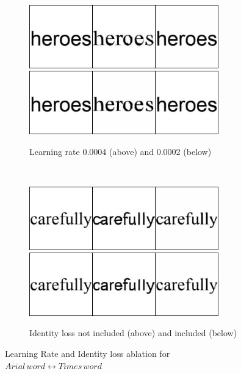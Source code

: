 \documentclass[10pt,twocolumn,letterpaper]{article}
\begin{document}
\begin{figure}[!htb]
     \centering
     \begin{subfigure}[]{0.49\textwidth}
         \centering
         \includegraphics[width=0.9\textwidth]{test_a_2_b_203}\\
         \vspace{0.3cm}
		 \includegraphics[width=0.9\textwidth]{test_a_2_b_203_g}\\
		 \caption{Learning rate 0.0004 (above) and 0.0002 (below)}
         \label{fig:a2f_w_lr}
     \end{subfigure}
     ~
     \begin{subfigure}[]{0.49\textwidth}
         \centering
         \includegraphics[width=0.9\textwidth]{test_b_2_a_68}\\
         \vspace{0.3cm}
		 \includegraphics[width=0.9\textwidth]{test_b_2_a_68_g}\\
		 \caption{Identity loss not included (above) and included (below)}
         \label{fig:a2f_w_id}
     \end{subfigure}

     \caption{Learning Rate and Identity loss ablation for $Arial \, word \leftrightarrow Times \, word$}
     \label{fig:ablation3}
\end{figure}
\end{document}
